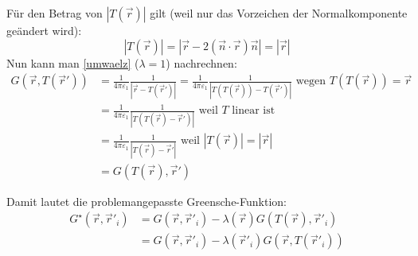 		  	 Für den Betrag von $\left|T(\vec{r} )\right|$ gilt (weil nur das Vorzeichen der Normalkomponente geändert wird):
		  	\begin{equation}
		  		\left|T(\vec{r} )\right| = \left| \vec{r}  - 2 (\vec{n}\cdot \vec{r} ) \vec{n} \right| = \left| \vec{r}  \right| 
		  	\end{equation}
		  	 Nun kann man \ref{umwaelz}  ($\lambda=1$) nachrechnen:
		  	\begin{equation}\begin{split}
		  			G(\vec{r} , T(\vec{r}' )) &= \frac{1}{4\pi\varepsilon_1} \frac{1}{\left|\vec{r}  -  T(\vec{r}' ) \right|} = \frac{1}{4\pi\varepsilon_1} \frac{1}{\left|T(T(\vec{r} )) - T(\vec{r}' ) \right|} \text{ wegen } T(T(\vec{r} )) = \vec{r} \\
		  			&= \frac{1}{4\pi\varepsilon_1} \frac{1}{\left|T( T(\vec{r} ) - \vec{r}'  )\right|} \text{ weil } T \text{ linear ist}\\
		  			&= \frac{1}{4\pi\varepsilon_1} \frac{1}{\left| T(\vec{r} ) - \vec{r}'  \right|} \text{ weil } \left|T(\vec{r} )\right| = \left| \vec{r}  \right| \\
		  			&= G(T(\vec{r} ), \vec{r}' )
		  	\end{split}\end{equation}
		  	
		  	Damit lautet die problemangepasste Greensche-Funktion:
		  	\begin{equation}\begin{split}
		  			G^\star(\vec{r} ,\vec{r}' _i) & = G(\vec{r} ,\vec{r}' _i) -\lambda(\vec{r} ) G(T(\vec{r} ),\vec{r}' _i)\\
		  			& = G(\vec{r} ,\vec{r}' _i) -\lambda(\vec{r}' _i) G(\vec{r} ,  T(\vec{r}' _i))
		  	\end{split}\end{equation}
		  	
